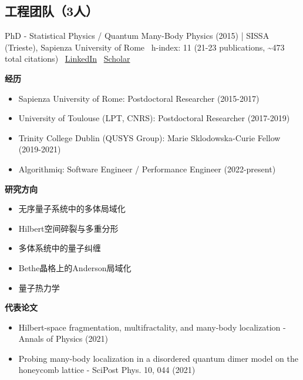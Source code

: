 \subsection{工程团队（3人）}
\vspace{4pt}
\par{\footnotesize\color{graytext}PhD - Statistical Physics / Quantum Many-Body Physics (2015) | SISSA (Trieste), Sapienza University of Rome \textbar\  h-index: 11 (21-23 publications, \textasciitilde{}473 total citations) \textbar\  \href{https://www.linkedin.com/in/francesca-pietracaprina/}{LinkedIn} \textbar\  \href{Not directly found; indexed on zbMATH (https://zbmath.org/authors/pietracaprina.francesca), MathSciNet (Author ID 1220640), and arXivLens (https://arxivlens.com/Author/Details/francesca-pietracaprina-2141-25463508)}{Scholar}}
\par{\footnotesize\color{mainred}\textbf{经历}}
\begin{itemize}[leftmargin=1.2em,itemsep=0pt,topsep=0pt]
\item {\footnotesize Sapienza University of Rome: Postdoctoral Researcher (2015-2017)}
\item {\footnotesize University of Toulouse (LPT, CNRS): Postdoctoral Researcher (2017-2019)}
\item {\footnotesize Trinity College Dublin (QUSYS Group): Marie Sklodowska-Curie Fellow (2019-2021)}
\item {\footnotesize Algorithmiq: Software Engineer / Performance Engineer (2022-present)}
\end{itemize}
\par{\footnotesize\color{mainred}\textbf{研究方向}}
\begin{itemize}[leftmargin=1.2em,itemsep=0pt,topsep=0pt]
\item {\footnotesize 无序量子系统中的多体局域化}
\item {\footnotesize Hilbert空间碎裂与多重分形}
\item {\footnotesize 多体系统中的量子纠缠}
\item {\footnotesize Bethe晶格上的Anderson局域化}
\item {\footnotesize 量子热力学}
\end{itemize}
\par{\footnotesize\color{mainred}\textbf{代表论文}}
\begin{itemize}[leftmargin=1.2em,itemsep=0pt,topsep=0pt]
\item {\footnotesize Hilbert-space fragmentation, multifractality, and many-body localization - Annals of Physics (2021)}
\item {\footnotesize Probing many-body localization in a disordered quantum dimer model on the honeycomb lattice - SciPost Phys. 10, 044 (2021)}
\end{itemize}
